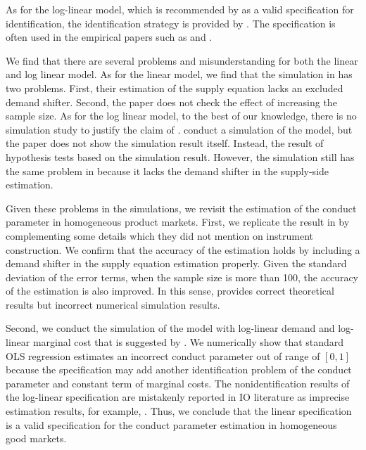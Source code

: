 \documentclass[11pt, a4paper]{article}
\begin{document}
As for the log-linear model, which is recommended by \cite{perloff2012collinearity} as a valid specification for identification, the identification strategy is provided by \citet{lau1982identifying}. The specification is often used in the empirical papers such as \cite{okazaki2022excess} and \cite{merel2009measuring}.

We find that there are several problems and misunderstanding for both the linear and log linear model.
As for the linear model, we find that the simulation in \cite{perloff2012collinearity} has two problems.
First, their estimation of the supply equation lacks an excluded demand shifter.
Second, the paper does not check the effect of increasing the sample size. 
As for the log linear model, to the best of our knowledge, there is no simulation study to justify the claim of \cite{perloff2012collinearity}.
\cite{hyde1995can} conduct a simulation of the model, but the paper does not show the simulation result itself. Instead, the result of hypothesis tests based on the simulation result.
However, the simulation still has the same problem in \cite{perloff2012collinearity} because it lacks the demand shifter in the supply-side estimation.

Given these problems in the simulations, we revisit the estimation of the conduct parameter in homogeneous product markets.
First, we replicate the result in \cite{perloff2012collinearity} by complementing some details which they did not mention on instrument construction. 
We confirm that the accuracy of the estimation holds by including a demand shifter in the supply equation estimation properly. 
Given the standard deviation of the error terms, when the sample size is more than 100, the accuracy of the estimation is also improved.
In this sense, \cite{perloff2012collinearity} provides correct theoretical results but incorrect numerical simulation results.

Second, we conduct the simulation of the model with log-linear demand and log-linear marginal cost that is suggested by \cite{perloff2012collinearity}. 
We numerically show that standard OLS regression estimates an incorrect conduct parameter out of range of $[0,1]$ because the specification may add another identification problem of the conduct parameter and constant term of marginal costs. 
The nonidentification results of the log-linear specification are mistakenly reported in IO literature as imprecise estimation results, for example, \cite{okazaki2022excess}. 
Thus, we conclude that the linear specification is a valid specification for the conduct parameter estimation in homogeneous good markets.
\end{document}

